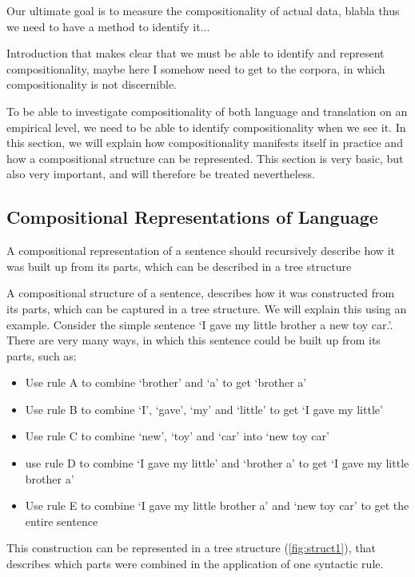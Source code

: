 \documentclass{report}
\theoremstyle{break}
\begin{document}
Our ultimate goal is to measure the compositionality of actual data, blabla thus we need to have a method to identify it... 

Introduction that makes clear that we must be able to identify and represent compositionality, maybe here I somehow need to get to the corpora, in which compositionality is not discernible.

To be able to investigate compositionality of both language and translation on an empirical level, we need to be able to identify compositionality when we see it. In this section, we will explain how compositionality manifests itself in practice and how a compositional structure can be represented. This section is very basic, but also very important, and will therefore be treated nevertheless.

\subsection{Compositional Representations of Language}

A compositional representation of a sentence should recursively describe how it was built up from its parts, which can be described in a tree structure

A compositional structure of a sentence, describes how it was constructed from its parts, which can be captured in a tree structure. We will explain this using an example. Consider the simple sentence `I gave my little brother a new toy car.'. There are very many ways, in which this sentence could be built up from its parts, such as:\begin{itemize}
\item Use rule A to combine `brother' and `a' to get `brother a'
\item Use rule B to combine `I', `gave', `my' and `little' to get `I gave my little'
\item Use rule C to combine `new', `toy' and `car' into `new toy car'
\item use rule D to combine `I gave my little' and `brother a' to get `I gave my little brother a'
\item Use rule E to combine `I gave my little brother a' and `new toy car' to get the entire sentence
\end{itemize}

This construction can be represented in a tree structure (\ref{fig:struct1}), that describes which parts were combined in the application of one syntactic rule. 
\end{document}
